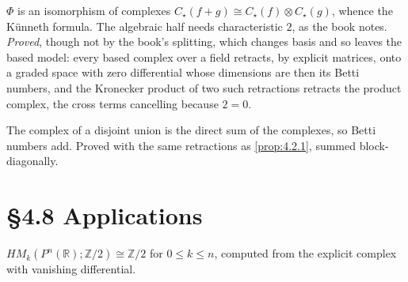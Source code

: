 \begin{proposition}
  \label{prop:4.2.1}
  \leanok
  $\Phi$ is an isomorphism of complexes $C_\star(f+g) \cong C_\star(f)\otimes
  C_\star(g)$, whence the K\"unneth formula.  The algebraic half needs
  characteristic $2$, as the book notes.  \emph{Proved}, though not by the
  book's splitting, which changes basis and so leaves the based model: every
  based complex over a field retracts, by explicit matrices, onto a graded space
  with zero differential whose dimensions are then its Betti numbers, and the
  Kronecker product of two such retractions retracts the product complex, the
  cross terms cancelling because $2 = 0$.
\end{proposition}

\begin{corollary}
  \label{cor:4.5.5}
  \leanok
  The complex of a disjoint union is the direct sum of the complexes, so Betti
  numbers add.  Proved with the same retractions as \ref{prop:4.2.1}, summed
  block-diagonally.
\end{corollary}

\section{\S4.8 Applications}

\begin{theorem}
  \label{thm:4.8.2}
  \leanok
  $HM_k(P^n(\mathbb{R});\mathbb{Z}/2) \cong \mathbb{Z}/2$ for $0 \le k \le n$,
  computed from the explicit complex with vanishing differential.
\end{theorem}

